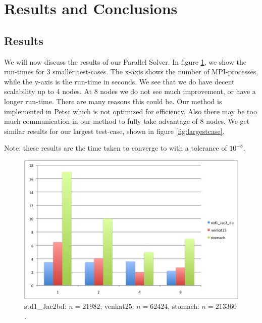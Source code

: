 \documentclass[a4paper,12pt]{article}
\begin{document}

\section{Results and Conclusions}
\subsection{Results}

We will now discuss the results of our Parallel Solver. In figure \ref{fig:smallcases}, we show the run-times for 3 smaller test-cases. The x-axis shows the number of MPI-processes, while the y-axis is the run-time in seconds. We see that we do have decent scalability up to 4 nodes. At 8 nodes we do not see much improvement, or have a longer run-time. There are many reasons this could be. Our method is implemented in Petsc which is not optimized for efficiency. Also there may be too much communication in our method to fully take advantage of 8 nodes. We get similar results for our largest test-case, shown in figure \ref{fig:largestcase}.

Note: these results are the time taken to converge to with a tolerance of $10^{-8}$.


\begin{figure}[h] %
   \centering
   \includegraphics[width=5in]{Images/runtimes.jpg}
   \caption{std1\_Jac2bd: $n = 21982$; venkat25: $n=62424$, stomach: $n=213360$.}
   \label{fig:smallcases}
\end{figure}
\end{document}
